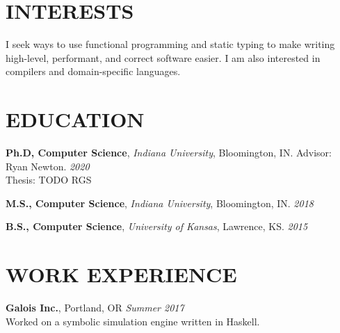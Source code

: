 \documentclass{res}
\begin{document}
\address{\texttt{rgscott@indiana.edu} $\bullet$ \texttt{ryanglscott.github.io}}

\begin{resume}

\section{INTERESTS}
    I seek ways to use functional programming and static typing to make writing high-level, performant, and correct software easier. I am also interested in compilers and domain-specific languages.

\section{EDUCATION}
     \textbf{Ph.D, Computer Science}, \textit{Indiana University}, Bloomington, IN. Advisor: Ryan Newton. \hfill \textit{2020} \\
    Thesis: TODO RGS

     \textbf{M.S., Computer Science}, \textit{Indiana University}, Bloomington, IN. \hfill \textit{2018}

     \textbf{B.S., Computer Science}, \textit{University of Kansas}, Lawrence, KS. \hfill \textit{2015}

\section{WORK EXPERIENCE}
    \textbf{Galois Inc.}, Portland, OR \hfill \textit{Summer 2017} \\
    Worked on a symbolic simulation engine written in Haskell.


\end{resume}
\end{document}
